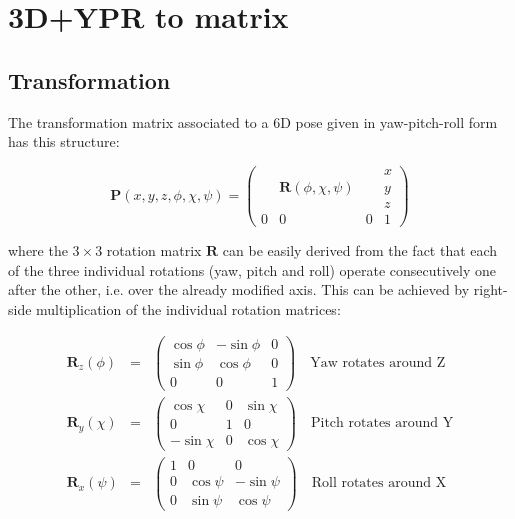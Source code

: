 \documentclass[a4paper,11pt]{report}
\begin{document}
\section{3D+YPR to matrix }
\label{sect:ypr2mat}

\subsection{Transformation}

The transformation matrix associated to a 6D pose given in yaw-pitch-roll form has this structure:

\begin{equation}
\mathbf{P}(x,y,z,\phi,\chi,\psi)=\left(
  \begin{array}{ccc|c}
   & & & x \\
   & \mathbf{R}(\phi,\chi,\psi) & & y \\
   & & & z \\ \hline
   0 & 0 & 0& 1
  \end{array}
\right)
\label{eq:matP_ypr}
\end{equation}

\noindent where the $3 \times 3$ rotation matrix $\mathbf{R}$ can be easily derived
from the fact that each of the three individual rotations (yaw, pitch and roll) operate
consecutively one after the other, i.e. over the already modified axis.
This can be achieved by right-side multiplication of the individual rotation matrices:

\begin{eqnarray}
\mathbf{R}_z(\phi) &=&
\left(
\begin{array}{ccc}
\cos \phi & -\sin \phi & 0 \\
\sin \phi & \cos \phi & 0 \\
0 & 0 & 1
\end{array}
\right) \quad \mathrm{\text{Yaw rotates around Z}} \\
\mathbf{R}_y(\chi) &= &
\left(
\begin{array}{ccc}
\cos \chi & 0 & \sin \chi \\
0 & 1 & 0 \\
-\sin \chi & 0 & \cos \chi
\end{array}
\right) \quad \mathrm{\text{Pitch rotates around Y}} \\
\mathbf{R}_x(\psi) &=&
\left(
\begin{array}{ccc}
1 & 0 & 0 \\
0 & \cos \psi & -\sin \psi \\
0 & \sin \psi &  \cos \psi
\end{array}
\right) \quad \mathrm{\text{Roll rotates around X}}
\end{eqnarray}
\end{document}
